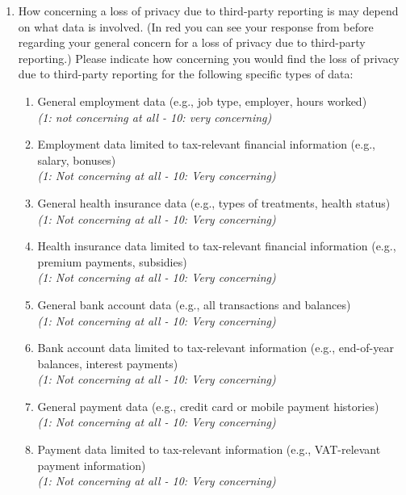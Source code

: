 \documentclass[11pt]{article}
\begin{document}
\begin{enumerate}[resume]
    \item How concerning a loss of privacy due to third-party reporting is may depend on what data is involved. (In red you can see your response from before regarding your general concern for a loss of privacy due to third-party reporting.) Please indicate how concerning you would find the loss of privacy due to third-party reporting for the following specific types of data:

\begin{enumerate}[label=\alph*)]
        \item General employment data (e.g., job type, employer, hours worked)\\
        \textit{(1: not concerning at all - 10: very concerning)}
        \item Employment data limited to tax-relevant financial information (e.g., salary, bonuses)\\
        \textit{(1: Not concerning at all - 10: Very concerning)}
        \item General health insurance data (e.g., types of treatments, health status)\\
        \textit{(1: Not concerning at all - 10: Very concerning)}
        \item Health insurance data limited to tax-relevant financial information (e.g., premium payments, subsidies)\\
        \textit{(1: Not concerning at all - 10: Very concerning)}
        \item General bank account data (e.g., all transactions and balances)\\
        \textit{(1: Not concerning at all - 10: Very concerning)}
        \item Bank account data limited to tax-relevant information (e.g., end-of-year balances, interest payments)\\
        \textit{(1: Not concerning at all - 10: Very concerning)}
        \item General payment data (e.g., credit card or mobile payment histories)\\
        \textit{(1: Not concerning at all - 10: Very concerning)}
        \item Payment data limited to tax-relevant information (e.g., VAT-relevant payment information)\\
        \textit{(1: Not concerning at all - 10: Very concerning)}
\end{enumerate}
\end{enumerate}
\end{document}
